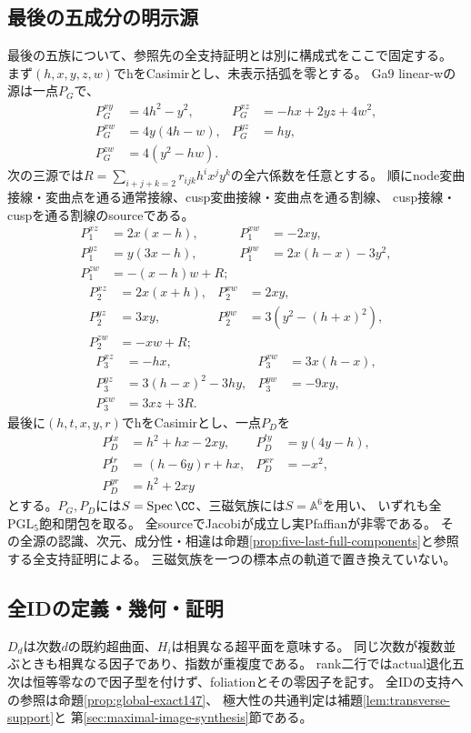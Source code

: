 \subsection{最後の五成分の明示源}\label{source:last-five-explicit}
最後の五族について、参照先の全支持証明とは別に構成式をここで固定する。
まず$(h,x,y,z,w)$でhをCasimirとし、未表示括弧を零とする。
Ga9 linear-wの源は一点$P_G$で、
\[
\begin{aligned}
 P_G^{xy}&=4h^2-y^2,&P_G^{xz}&=-hx+2yz+4w^2,\\
 P_G^{xw}&=4y(4h-w),&P_G^{yz}&=hy,\\
 P_G^{zw}&=4(y^2-hw).
\end{aligned}
\]
次の三源では$R=\sum_{i+j+k=2}r_{ijk}h^ix^jy^k$の全六係数を任意とする。
順にnode変曲接線・変曲点を通る通常接線、cusp変曲接線・変曲点を通る割線、
cusp接線・cuspを通る割線のsourceである。
\[
\begin{aligned}
 P_1^{xz}&=2x(x-h),&P_1^{xw}&=-2xy,\\
 P_1^{yz}&=y(3x-h),&P_1^{yw}&=2x(h-x)-3y^2,\\
 P_1^{zw}&=-(x-h)w+R;
\end{aligned}
\]
\[
\begin{aligned}
 P_2^{xz}&=2x(x+h),&P_2^{xw}&=2xy,\\
 P_2^{yz}&=3xy,&P_2^{yw}&=3(y^2-(h+x)^2),\\
 P_2^{zw}&=-xw+R;
\end{aligned}
\]
\[
\begin{aligned}
 P_3^{xz}&=-hx,&P_3^{xw}&=3x(h-x),\\
 P_3^{yz}&=3(h-x)^2-3hy,&P_3^{yw}&=-9xy,\\
 P_3^{zw}&=3xz+3R.
\end{aligned}
\]
最後に$(h,t,x,y,r)$でhをCasimirとし、一点$P_D$を
\[
\begin{aligned}
 P_D^{tx}&=h^2+hx-2xy,&P_D^{ty}&=y(4y-h),\\
 P_D^{tr}&=(h-6y)r+hx,&P_D^{xr}&=-x^2,\\
 P_D^{yr}&=h^2+2xy
\end{aligned}
\]
とする。$P_G,P_D$には$S=\operatorname{Spec}\CC$、三磁気族には$S=\mathbb A^6$を用い、
いずれも全$\mathrm{PGL}_5$飽和閉包を取る。
全sourceでJacobiが成立し実Pfaffianが非零である。
その全源の認識、次元、成分性・相違は命題\ref{prop:five-last-full-components}と参照する全支持証明による。
三磁気族を一つの標本点の軌道で置き換えていない。

\subsection{全IDの定義・幾何・証明}
$D_d$は次数$d$の既約超曲面、$H_i$は相異なる超平面を意味する。
同じ次数が複数並ぶときも相異なる因子であり、指数が重複度である。
rank二行ではactual退化五次は恒等零なので因子型を付けず、foliationとその零因子を記す。
全IDの支持への参照は命題\ref{prop:global-exact147}、
極大性の共通判定は補題\ref{lem:transverse-support}と
第\ref{sec:maximal-image-synthesis}節である。

